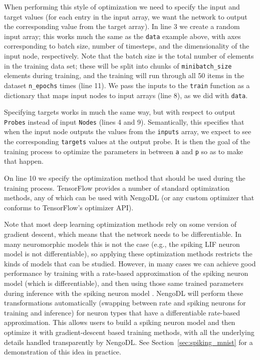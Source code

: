 \documentclass{article}
\begin{document}
\lstset{numbers=left}


When performing this style of optimization we need to specify the input and target values (for each entry in the input array, we want the network to output the corresponding value from the target array).  In line 3 we create a random input array; this works much the same as the \texttt{data} example above, with axes corresponding to batch size, number of timesteps, and the dimensionality of the input node, respectively.  Note that the batch size is the total number of elements in the training data set; these will be split into chunks of \texttt{minibatch\_size} elements during training, and the training will run through all 50 items in the dataset \texttt{n\_epochs} times (line 11).  We pass the inputs to the \texttt{train} function as a dictionary that maps input nodes to input arrays (line 8), as we did with \texttt{data}.

Specifying targets works in much the same way, but with respect to output \texttt{Probes} instead of input \texttt{Nodes} (lines 4 and 9).  Semantically, this specifies that when the input node outputs the values from the \texttt{inputs} array, we expect to see the corresponding \texttt{targets} values at the output probe.  It is then the goal of the training process to optimize the parameters in between \texttt{a} and \texttt{p} so as to make that happen.

On line 10 we specify the optimization method that should be used during the training process.  TensorFlow provides a number of standard optimization methods, any of which can be used with NengoDL (or any custom optimizer that conforms to TensorFlow's optimizer API).  

Note that most deep learning optimization methods rely on some version of gradient descent, which means that the network needs to be differentiable.  In many neuromorphic models this is not the case (e.g., the spiking LIF neuron model is not differentiable), so applying these optimization methods restricts the kinds of models that can be studied.  However, in many cases we can achieve good performance by training with a rate-based approximation of the spiking neuron model (which is differentiable), and then using those same trained parameters during inference with the spiking neuron model \citep{Hunsberger2016}.  NengoDL will perform these transformations automatically (swapping between rate and spiking neurons for training and inference) for neuron types that have a differentiable rate-based approximation.  This allows users to build a spiking neuron model and then optimize it with gradient-descent based training methods, with all the underlying details handled transparently by NengoDL.  See Section~\ref{sec:spiking_mnist} for a demonstration of this idea in practice.
\end{document}
